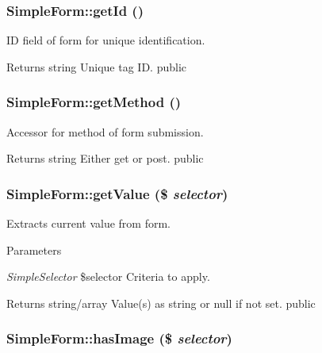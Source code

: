 \hypertarget{class_simple_form_a3710801a5f41d259b5b30d64b8c20b67}{
\subsubsection[{getId}]{\setlength{\rightskip}{0pt plus 5cm}SimpleForm::getId ()}}
\label{class_simple_form_a3710801a5f41d259b5b30d64b8c20b67}
ID field of form for unique identification. \begin{DoxyReturn}{Returns}
string Unique tag ID.  public 
\end{DoxyReturn}
\hypertarget{class_simple_form_a9a1d22b5a6f9e50cce3a51a0be3a940c}{
\subsubsection[{getMethod}]{\setlength{\rightskip}{0pt plus 5cm}SimpleForm::getMethod ()}}
\label{class_simple_form_a9a1d22b5a6f9e50cce3a51a0be3a940c}
Accessor for method of form submission. \begin{DoxyReturn}{Returns}
string Either get or post.  public 
\end{DoxyReturn}
\hypertarget{class_simple_form_a34b1a1d202d7471801d1afcfe4df6d83}{
\subsubsection[{getValue}]{\setlength{\rightskip}{0pt plus 5cm}SimpleForm::getValue (\$ {\em selector})}}
\label{class_simple_form_a34b1a1d202d7471801d1afcfe4df6d83}
Extracts current value from form. 
\begin{DoxyParams}{Parameters}
\item[{\em SimpleSelector}]\$selector Criteria to apply. \end{DoxyParams}
\begin{DoxyReturn}{Returns}
string/array Value(s) as string or null if not set.  public 
\end{DoxyReturn}
\hypertarget{class_simple_form_aca30d699b068184b79b365dd05dce9a5}{
\subsubsection[{hasImage}]{\setlength{\rightskip}{0pt plus 5cm}SimpleForm::hasImage (\$ {\em selector})}}
